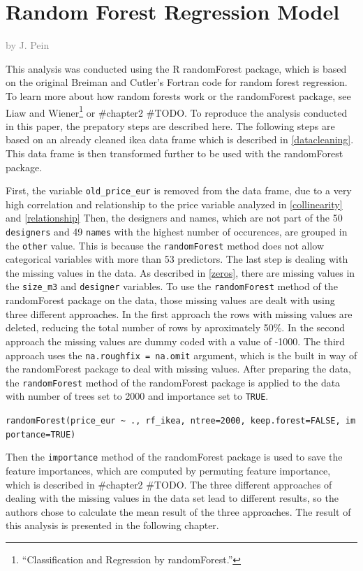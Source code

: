 \documentclass[a4paper, nobind]{templates/ociamthesis}
\begin{document}
\hypertarget{rf}{%
\section{Random Forest Regression Model}\label{rf}}

\textcolor{gray}{by J. Pein}

This analysis was conducted using the R randomForest package, which is based on the original Breiman and Cutler's Fortran code for random forest regression. To learn more about how random forests work or the randomForest package, see Liaw and Wiener\footnote{``Classification and Regression by randomForest.''} or \#chapter2 \#TODO. To reproduce the analysis conducted in this paper, the prepatory steps are described here. The following steps are based on an already cleaned ikea data frame which is described in \ref{datacleaning}. This data frame is then transformed further to be used with the randomForest package.

First, the variable \texttt{old\_price\_eur} is removed from the data frame, due to a very high correlation and relationship to the price variable analyzed in \ref{collinearity} and \ref{relationship} Then, the designers and names, which are not part of the 50 \texttt{designers} and 49 \texttt{names} with the highest number of occurences, are grouped in the \texttt{other} value. This is because the \texttt{randomForest} method does not allow categorical variables with more than 53 predictors. The last step is dealing with the missing values in the data. As described in \ref{zeros}, there are missing values in the \texttt{size\_m3} and \texttt{designer} variables. To use the \texttt{randomForest} method of the randomForest package on the data, those missing values are dealt with using three different approaches. In the first approach the rows with missing values are deleted, reducing the total number of rows by aproximately 50\%. In the second approach the missing values are dummy coded with a value of -1000. The third approach uses the \texttt{na.roughfix\ =\ na.omit} argument, which is the built in way of the randomForest package to deal with missing values.
After preparing the data, the \texttt{randomForest} method of the randomForest package is applied to the data with number of trees set to 2000 and importance set to \texttt{TRUE}.

\texttt{randomForest(price\_eur\ \textasciitilde{}\ .,\ rf\_ikea,\ ntree=2000,\ keep.forest=FALSE,\ importance=TRUE)}

Then the \texttt{importance} method of the randomForest package is used to save the feature importances, which are computed by permuting feature importance, which is described in \#chapter2 \#TODO. The three different approaches of dealing with the missing values in the data set lead to different results, so the authors chose to calculate the mean result of the three approaches. The result of this analysis is presented in the following chapter.
\end{document}
